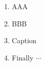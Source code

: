 \begin{appendix}

  \lipsum[13]

  \begin{enumerate}
    \item AAA
    \item BBB
    \item Caption
    \item Finally $\cdots$
  \end{enumerate}

\end{appendix}





